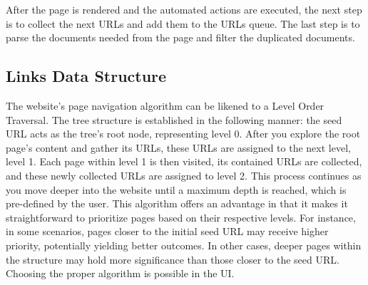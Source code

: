After the page is rendered and the automated actions are executed, the next step is to collect the next URLs and add them to the URLs queue. The last step is to parse the documents needed from the page and filter the duplicated documents. 


\subsection{Links Data Structure}
The website's page navigation algorithm can be likened to a Level Order Traversal. The tree structure is established in the following manner: the seed URL acts as the tree's root node, representing level 0. After you explore the root page's content and gather its URLs, these URLs are assigned to the next level, level 1. Each page within level 1 is then visited, its contained URLs are collected, and these newly collected URLs are assigned to level 2. This process continues as you move deeper into the website until a maximum depth is reached, which is pre-defined by the user.
This algorithm offers an advantage in that it makes it straightforward to prioritize pages based on their respective levels. For instance, in some scenarios, pages closer to the initial seed URL may receive higher priority, potentially yielding better outcomes. In other cases, deeper pages within the structure may hold more significance than those closer to the seed URL. Choosing the proper algorithm is possible in the UI.

